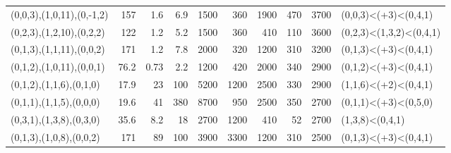 \begin{tabular}{lrrrrrrrrl}
 (0,0,3),(1,0,11),(0,-1,2)   &      157   &                              1.6  &                            6.9  &                              1500 &                             360 &                              1900 &                             470 &       3700 & (0,0,3)<(+3)<(0,4,1)    \\
 (0,2,3),(1,2,10),(0,2,2)    &      122   &                              1.2  &                            5.2  &                              1500 &                             360 &                               410 &                             110 &       3600 & (0,2,3)<(1,3,2)<(0,4,1) \\
 (0,1,3),(1,1,11),(0,0,2)    &      171   &                              1.2  &                            7.8  &                              2000 &                             320 &                              1200 &                             310 &       3200 & (0,1,3)<(+3)<(0,4,1)    \\
 (0,1,2),(1,0,11),(0,0,1)    &       76.2 &                              0.73 &                            2.2  &                              1200 &                             420 &                              2000 &                             340 &       2900 & (0,1,2)<(+3)<(0,4,1)    \\
 (0,1,2),(1,1,6),(0,1,0)     &       17.9 &                             23    &                          100    &                              5200 &                            1200 &                              2500 &                             330 &       2900 & (1,1,6)<(+2)<(0,4,1)    \\
 (0,1,1),(1,1,5),(0,0,0)     &       19.6 &                             41    &                          380    &                              8700 &                             950 &                              2500 &                             350 &       2700 & (0,1,1)<(+3)<(0,5,0)    \\
 (0,3,1),(1,3,8),(0,3,0)     &       35.6 &                              8.2  &                           18    &                              2700 &                            1200 &                               410 &                              52 &       2700 & (1,3,8)<(0,4,1)         \\
 (0,1,3),(1,0,8),(0,0,2)     &      171   &                             89    &                          100    &                              3900 &                            3300 &                              1200 &                             310 &       2500 & (0,1,3)<(+3)<(0,4,1)    \\

\end{tabular}
